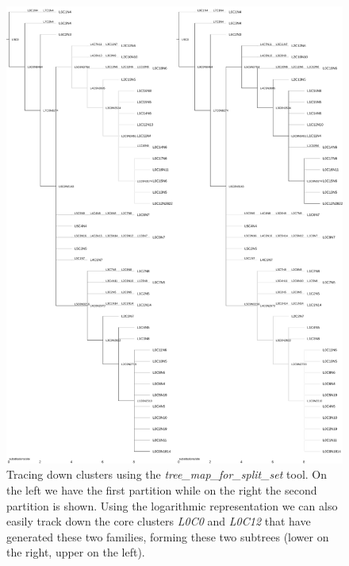 \begin{figure}
  \begin{center}
    \includegraphics[scale=0.3]{tree-clust-tutorial.pdf}
    \caption{Tracing down clusters using the
      \emph{tree\_map\_for\_split\_set} tool. On the left we have the
      first partition while on the right the second partition is
      shown. Using the logarithmic representation we can also easily
      track down the core clusters \emph{L0C0} and \emph{L0C12} that
      have generated these two families, forming these two subtrees
      (lower on the right, upper on the left).}
    \label{fig-treemapss-tutorial}
  \end{center}
\end{figure}


